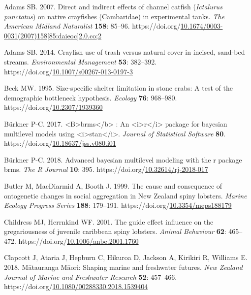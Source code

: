 \documentclass[
  letterpaper,
  DIV=11,
  numbers=noendperiod]{scrartcl}
\newlength{\cslhangindent}
\newenvironment{CSLReferences}[2] %
 {\begin{list}{}{%
  \setlength{\itemindent}{0pt}
  \setlength{\leftmargin}{0pt}
  \setlength{\parsep}{0pt}
  \ifodd #1
   \setlength{\leftmargin}{\cslhangindent}
   \setlength{\itemindent}{-1\cslhangindent}
  \fi
  \setlength{\itemsep}{#2\baselineskip}}}
 {\end{list}}
\begin{document}
\protect{}\label{refs}
\begin{CSLReferences}{1}{0}
Adams SB. 2007. Direct and indirect effects of channel catfish
({\emph{Ictalurus punctatus}}) on native crayfishes ({Cambaridae}) in
experimental tanks. \emph{The American Midland Naturalist} \textbf{158}:
85--96.
https://doi.org/\href{https://doi.org/10.1674/0003-0031(2007)158\%5B85:daieoc\%5D2.0.co;2}{10.1674/0003-0031(2007)158{[}85:daieoc{]}2.0.co;2}

Adams SB. 2014. Crayfish use of trash versus natural cover in incised,
sand-bed streams. \emph{Environmental Management} \textbf{53}: 382--392.
https://doi.org/\href{https://doi.org/10.1007/s00267-013-0197-3}{10.1007/s00267-013-0197-3}

Beck MW. 1995. Size-specific shelter limitation in stone crabs: A test
of the demographic bottleneck hypothesis. \emph{Ecology} \textbf{76}:
968--980.
https://doi.org/\href{https://doi.org/10.2307/1939360}{10.2307/1939360}

Bürkner P-C. 2017. \textless B\textgreater brms\textless/b\textgreater{}
: An \textless i\textgreater r\textless/i\textgreater{} package for
bayesian multilevel models using
\textless i\textgreater stan\textless/i\textgreater. \emph{Journal of
Statistical Software} \textbf{80}.
https://doi.org/\href{https://doi.org/10.18637/jss.v080.i01}{10.18637/jss.v080.i01}

Bürkner P-C. 2018. Advanced bayesian multilevel modeling with the r
package brms. \emph{The R Journal} \textbf{10}: 395.
https://doi.org/\href{https://doi.org/10.32614/rj-2018-017}{10.32614/rj-2018-017}

Butler M, MacDiarmid A, Booth J. 1999. The cause and consequence of
ontogenetic changes in social aggregation in {New Zealand} spiny
lobsters. \emph{Marine Ecology Progress Series} \textbf{188}: 179--191.
https://doi.org/\href{https://doi.org/10.3354/meps188179}{10.3354/meps188179}

Childress MJ, Herrnkind WF. 2001. The guide effect influence on the
gregariousness of juvenile caribbean spiny lobsters. \emph{Animal
Behaviour} \textbf{62}: 465--472.
https://doi.org/\href{https://doi.org/10.1006/anbe.2001.1760}{10.1006/anbe.2001.1760}

Clapcott J, Ataria J, Hepburn C, Hikuroa D, Jackson A, Kirikiri R,
Williams E. 2018. {Mātauranga Māori}: Shaping marine and freshwater
futures. \emph{New Zealand Journal of Marine and Freshwater Research}
\textbf{52}: 457--466.
https://doi.org/\href{https://doi.org/10.1080/00288330.2018.1539404}{10.1080/00288330.2018.1539404}


\end{CSLReferences}
\end{document}
